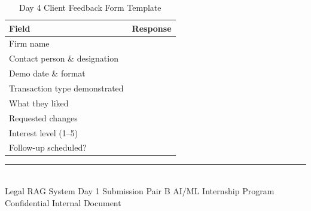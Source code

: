 \documentclass[12pt, a4paper]{article}
\begin{document}
\begin{table}[h]
\centering
\caption{Day 4 Client Feedback Form Template}
\renewcommand{\arraystretch}{1.5}
\begin{tabularx}{\textwidth}{lX}
\toprule
\textbf{Field} & \textbf{Response} \\
\midrule
Firm name                           & \\
Contact person \& designation       & \\
Demo date \& format                 & \\
Transaction type demonstrated       & \\
What they liked                     & \\
Requested changes                   & \\
Interest level (1--5)               & \\
Follow-up scheduled?                & \\
\bottomrule
\end{tabularx}
\end{table}


\vspace{1.5cm}
\vfill

\begin{center}
    {\color{primary}\rule{0.55\textwidth}{0.5pt}}\\[0.35cm]
    {\small\color{darkgray}
    Legal RAG System \textperiodcentered{}
    Day 1 Submission \textperiodcentered{}
    Pair B \textperiodcentered{}
    AI/ML Internship Program}\\[0.15cm]
    {\small\color{darkgray} Confidential \textperiodcentered{} Internal Document}
\end{center}
\end{document}
